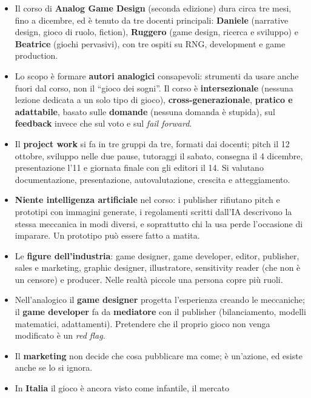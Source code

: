 \begin{itemize}
  \item Il corso di \textbf{Analog Game Design} (seconda edizione) dura circa tre
        mesi, fino a dicembre, ed è tenuto da tre docenti principali:
        \textbf{Daniele} (narrative design, gioco di ruolo, fiction),
        \textbf{Ruggero} (game design, ricerca e sviluppo) e \textbf{Beatrice}
        (giochi pervasivi), con tre ospiti su RNG, development e game production.
  \item Lo scopo è formare \textbf{autori analogici} consapevoli: strumenti da
        usare anche fuori dal corso, non il ``gioco dei sogni''. Il corso è
        \textbf{intersezionale} (nessuna lezione dedicata a un solo tipo di
        gioco), \textbf{cross-generazionale}, \textbf{pratico e adattabile},
        basato sulle \textbf{domande} (nessuna domanda è stupida), sul
        \textbf{feedback} invece che sul voto e sul \emph{fail forward}.
  \item Il \textbf{project work} si fa in tre gruppi da tre, formati dai docenti;
        pitch il 12 ottobre, sviluppo nelle due pause, tutoraggi il sabato,
        consegna il 4 dicembre, presentazione l'11 e giornata finale con gli
        editori il 14. Si valutano documentazione, presentazione,
        autovalutazione, crescita e atteggiamento.
  \item \textbf{Niente intelligenza artificiale} nel corso: i publisher
        rifiutano pitch e prototipi con immagini generate, i regolamenti scritti
        dall'IA descrivono la stessa meccanica in modi diversi, e soprattutto chi
        la usa perde l'occasione di imparare. Un prototipo può essere fatto a
        matita.
  \item Le \textbf{figure dell'industria}: game designer, game developer,
        editor, publisher, sales e marketing, graphic designer, illustratore,
        sensitivity reader (che non è un censore) e producer. Nelle realtà
        piccole una persona copre più ruoli.
  \item Nell'analogico il \textbf{game designer} progetta l'esperienza creando
        le meccaniche; il \textbf{game developer} fa da \textbf{mediatore} con il
        publisher (bilanciamento, modelli matematici, adattamenti). Pretendere
        che il proprio gioco non venga modificato è un \emph{red flag}.
  \item Il \textbf{marketing} non decide che cosa pubblicare ma come; è
        un'azione, ed esiste anche se lo si ignora.
  \item In \textbf{Italia} il gioco è ancora visto come infantile, il mercato

\end{itemize}
